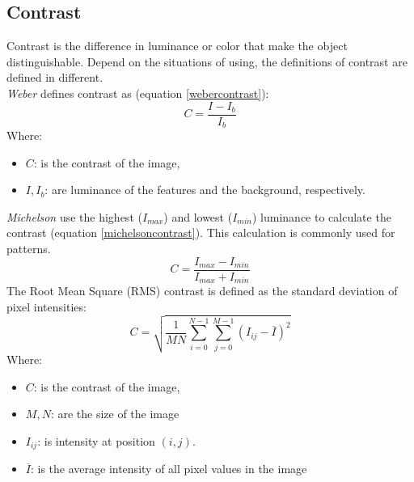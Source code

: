 \subsection{Contrast}
Contrast is the difference in luminance or color that make the object distinguishable. Depend on the situations of using, the definitions of contrast are defined in different.\\
\textit{Weber} \cite{fechner1948elements} defines contrast as (equation \ref{webercontrast}):
\begin{equation}
	C = \frac{I - I_b}{I_b}
	\label{webercontrast}
\end{equation}
Where:
\begin{itemize}
	\item  $C$: is the contrast of the image,
	\item  $I, I_b$: are luminance of the features and the background, respectively.
\end{itemize}
\textit{Michelson} \cite{michelson1995studies} use the highest ($I_{max}$) and lowest ($I_{min}$) luminance to calculate the contrast (equation \ref{michelsoncontrast}). This calculation is commonly used for patterns.
\begin{equation}
	C = \frac{I_{max} - I_{min}}{I_{max} + I_{min}}
	\label{michelsoncontrast}
\end{equation}
The Root Mean Square (RMS) \cite{peli1990contrast} contrast is defined as the standard deviation of pixel intensities: 
\begin{equation}
	C = \sqrt{\frac{1}{MN}\sum_{i=0}^{N-1}\sum_{j=0}^{M-1}(I_{ij} - \overline{I})^2}
\end{equation}
Where:
\begin{itemize}
	\item  $C$: is the contrast of the image,
	\item $M,N$: are the size of the image
	\item $I_{ij}$: is intensity at position $(i,j)$.
	\item $\overline{I}$: is the average intensity of all pixel values in the image
\end{itemize}
